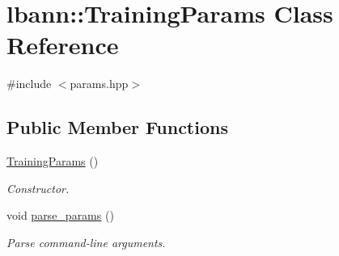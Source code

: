 \hypertarget{classlbann_1_1TrainingParams}{}\section{lbann\+:\+:Training\+Params Class Reference}
\label{classlbann_1_1TrainingParams}


{\ttfamily \#include $<$params.\+hpp$>$}

\subsection*{Public Member Functions}
\begin{DoxyCompactItemize}
\item 
\hyperlink{classlbann_1_1TrainingParams_a4ca5149e14ab1aed5f5a9c0e612ce62d}{Training\+Params} ()
\begin{DoxyCompactList}\small\item\em Constructor. \end{DoxyCompactList}\item 
void \hyperlink{classlbann_1_1TrainingParams_a245c0674a2132cb15f1198b1f4dd2bf8}{parse\+\_\+params} ()
\begin{DoxyCompactList}\small\item\em Parse command-\/line arguments. \end{DoxyCompactList}\end{DoxyCompactItemize}
